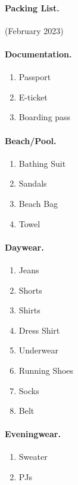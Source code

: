 \documentclass[12pt,english]{article}
\begin{document}
\paragraph{Packing List.} (February 2023) \\

\paragraph{Documentation.}
\begin{enumerate}
	\item{Passport}
	\item{E-ticket}
	\item{Boarding pass}
\end{enumerate}

\paragraph{Beach/Pool.}
\begin{enumerate} 
	\item{Bathing Suit}
	\item{Sandals}
	\item{Beach Bag}
	\item{Towel}
\end{enumerate}

\paragraph{Daywear.}
\begin{enumerate} 
	\item{Jeans}
	\item{Shorts}
	\item{Shirts}
	\item{Dress Shirt}
	\item{Underwear}
	\item{Running Shoes}
	\item{Socks}
	\item{Belt}
\end{enumerate}

\paragraph{Eveningwear.}
\begin{enumerate} 
	\item{Sweater}
	\item{PJs}
\end{enumerate}
\end{document}
